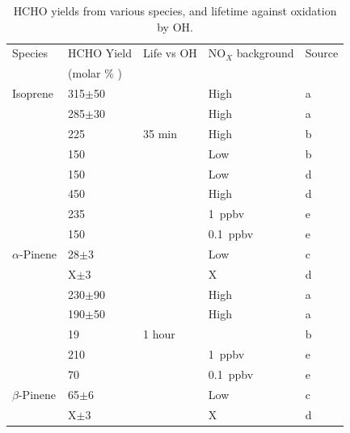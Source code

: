       \begin{table} \begin{threeparttable}
        \caption{ HCHO yields from various species, and lifetime against oxidation by OH. }
        \begin{tabular}{  l  l  l  l  l  }
          \toprule
          Species    & HCHO Yield    & Life vs OH   & NO$_X$ background & Source   \\
          & (molar \% )   &              &                   &          \\
          \midrule 
          Isoprene	& 315$\pm$50      &            & High          & a        \\ 
          & 285$\pm$30      &            & High          & a        \\ 
          & 225             & 35 min     & High          & b        \\ %
          & 150             &            & Low           & b        \\ %
          & 150             &            & Low           & d        \\
          & 450             &            & High          & d        \\
          & 235             &            & 1~ppbv        & e        \\
          & 150             &            & 0.1~ppbv      & e        \\
          $\alpha$-Pinene & 28$\pm$3        &        & Low                & c        \\ 
          & X$\pm$3         &        & X                  & d        \\ 
          & 230$\pm$90      &        & High        & a        \\ 
          & 190$\pm$50      &        & High        & a        \\ 
          & 19              & 1 hour &              & b        \\ %
          & 210             &        & 1~ppbv        & e        \\
          & 70              &        & 0.1~ppbv      & e        \\
          $\beta$-Pinene  & 65$\pm$6        &        & Low           & c      \\ 
          & X$\pm$3         &        & X             & d      \\ 

\end{tabular}
\end{threeparttable}
\end{table}
